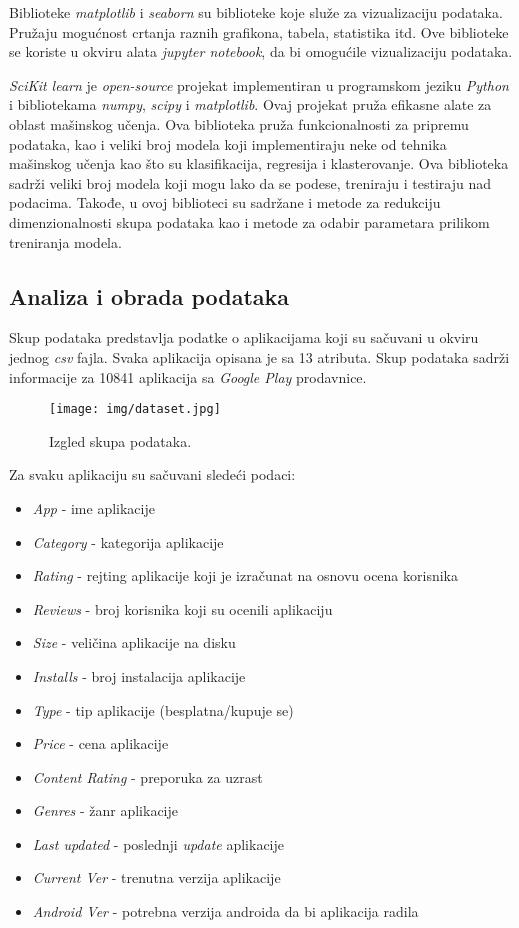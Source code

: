 \documentclass[a4paper,12pt,titlepage]{article}
\begin{document}
Biblioteke \emph{matplotlib} i \emph{seaborn} su biblioteke koje služe za vizualizaciju podataka. Pružaju mogućnost crtanja raznih grafikona, tabela, statistika itd. Ove biblioteke se koriste u okviru alata \emph{jupyter notebook}, da bi omogućile vizualizaciju podataka.

\emph{SciKit learn} je \emph{open-source} projekat implementiran u programskom jeziku \emph{Python} i bibliotekama \emph{numpy}, \emph{scipy} i \emph{matplotlib}. Ovaj projekat pruža efikasne alate za oblast mašinskog učenja. Ova biblioteka pruža funkcionalnosti za pripremu podataka, kao i veliki broj modela koji implementiraju neke od tehnika mašinskog učenja kao što su klasifikacija, regresija i klasterovanje. Ova biblioteka sadrži veliki broj modela koji mogu lako da se podese, treniraju i testiraju nad podacima. Takođe, u ovoj biblioteci su sadržane i metode za redukciju dimenzionalnosti skupa podataka kao i metode za odabir parametara prilikom treniranja modela.


\subsection{Analiza i obrada podataka}

Skup podataka predstavlja podatke o aplikacijama koji su sačuvani u okviru jednog \emph{csv} fajla. Svaka aplikacija opisana je sa 13 atributa. Skup podataka sadrži informacije za 10841 aplikacija sa \emph{Google Play} prodavnice. 

\begin{figure}[ht!]
\centering
\texttt{[image: img/dataset.jpg]}
\caption{Izgled skupa podataka.}
\label{Dataset}
\end{figure} 

Za svaku aplikaciju su sačuvani sledeći podaci:

\begin{itemize}
\item \emph{App} - ime aplikacije
\item \emph{Category} - kategorija aplikacije
\item \emph{Rating} - rejting aplikacije koji je izračunat na osnovu ocena korisnika
\item \emph{Reviews} - broj korisnika koji su ocenili aplikaciju
\item \emph{Size} - veličina aplikacije na disku  
\item \emph{Installs} - broj instalacija aplikacije 
\item \emph{Type} - tip aplikacije (besplatna/kupuje se) 
\item \emph{Price} - cena aplikacije
\item \emph{Content Rating} - preporuka za uzrast
\item \emph{Genres} - žanr aplikacije
\item \emph{Last updated} - poslednji \emph{update} aplikacije 
\item \emph{Current Ver} - trenutna verzija aplikacije
\item \emph{Android Ver} - potrebna verzija androida da bi aplikacija radila
\end{itemize}
\end{document}
